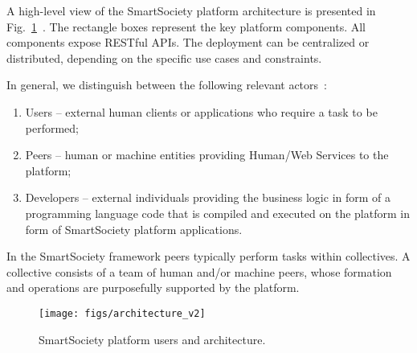 A high-level view of the SmartSociety platform architecture is presented in Fig.~\ref{fig:architecture}~\cite{scekic_soca2015}. 
The rectangle boxes represent the key platform components. All components expose RESTful APIs. The deployment can be centralized or distributed, depending on the specific use cases and constraints. 

In general, we distinguish between the following relevant actors~\cite{D7.2}:
\begin{enumerate}
\item Users – external human clients or applications who require a task to be performed;
\item Peers – human or machine entities providing Human/Web Services to the platform;
\item Developers – external individuals providing the business logic in form of a programming language code that is compiled and executed on the platform in form of SmartSociety platform applications.
\end{enumerate}
In the SmartSociety framework peers typically perform tasks within collectives. A collective consists of a team of human and/or machine peers, whose formation and operations are purposefully supported by the platform.


\begin{figure}[!ht]
 \centering
 \texttt{[image: figs/architecture\_v2]}%
 \caption{SmartSociety platform users and architecture.}
 \label{fig:architecture}
\end{figure}


